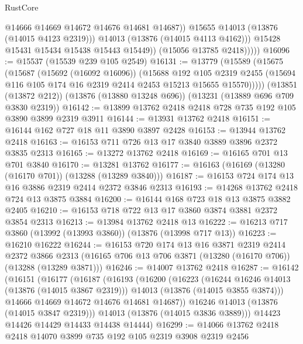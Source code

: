 \begin{lexlean}{RustCore}
\begin{coremodule}
                        @14666
                        @14669
                        @14672
                        @14676
                        @14681
                        @14687))
                    @15655
                    @14013
                    (@13876 (@14015 @4123 @2319)))
                  @14013
                  (@13876 (@14015 @4113 @4162)))
                @15428
                @15431
                @15434
                @15438
                @15443
                @15449))
            (@15056 @13785 @2418)))))
@16096 := @15537 (@15539 @239 @105 @2549)
@16131 := @13779
    (@15589
      (@15675
        (@15687
          (@15692 (@16092 @16096))
          (@15688
            @192
            @105
            @2319
            @2455
            (@15694 @116 @105 @174 @16 @2319 @2414 @2453 @15213 @15655 @15570)))))
    (@13851 (@13872 @212))
    (@13876 (@13880 @13248 @696))
    (@13231 (@13889 @696 @709 @3830 @2319))
@16142 := @13899 @13762 @2418 @2418 @728 @735 @192 @105 @3890 @3899 @2319 @3911
@16144 := @13931 @13762 @2418
@16151 := @16144 @162 @727 @18 @11 @3890 @3897 @2428
@16153 := @13944 @13762 @2418
@16163 := @16153 @711 @726 @13 @17 @3840 @3889 @3896 @2372 @3835 @2313
@16165 := @13272 @13762 @2418
@16169 := @16165 @701 @13 @701 @3840
@16170 := @13281 @13762
@16177 := @16163 (@16169 (@13280 (@16170 @701)) (@13288 (@13289 @3840)))
@16187 := @16153 @724 @174 @13 @16 @3886 @2319 @2414 @2372 @3846 @2313
@16193 := @14268 @13762 @2418 @724 @13 @3875 @3884
@16200 := @16144 @168 @723 @18 @13 @3875 @3882 @2405
@16210 := @16153 @718 @722 @13 @17 @3860 @3874 @3881 @2372 @3854 @2313
@16213 := @13984 @13762 @2418 @13
@16222 := @16213 @717 @3860 (@13992 (@13993 @3860)) (@13876 (@13998 @717 @13))
@16223 := @16210 @16222
@16244 := @16153
    @720
    @174
    @13
    @16
    @3871
    @2319
    @2414
    @2372
    @3866
    @2313
    (@16165 @706 @13 @706 @3871 (@13280 (@16170 @706)) (@13288 (@13289 @3871)))
@16246 := @14007 @13762 @2418
@16287 := @16142
    (@16151
      (@16177
        (@16187
          (@16193
            (@16200
              (@16223
                (@16244 @16246 @14013 (@13876 (@14015 @3867 @2319)))
                @14013
                (@13876 (@14015 @3855 @3874)))
              @14666
              @14669
              @14672
              @14676
              @14681
              @14687))
          @16246
          @14013
          (@13876 (@14015 @3847 @2319)))
        @14013
        (@13876 (@14015 @3836 @3889)))
      @14423
      @14426
      @14429
      @14433
      @14438
      @14444)
@16299 := @14066 @13762 @2418 @2418 @14070 @3899 @735 @192 @105 @2319 @3908 @2319 @2456

\end{coremodule}
\end{lexlean}
